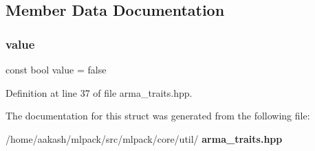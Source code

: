 \subsection{Member Data Documentation}
\mbox{\label{structIsVector_a11ddd051208250c32dc4985abcafa86d}} 
\subsubsection{value}
{\footnotesize\ttfamily const bool value = false\hspace{0.3cm}{\ttfamily [static]}}



Definition at line 37 of file arma\+\_\+traits.\+hpp.



The documentation for this struct was generated from the following file\+:\begin{DoxyCompactItemize}
\item 
/home/aakash/mlpack/src/mlpack/core/util/\textbf{ arma\+\_\+traits.\+hpp}\end{DoxyCompactItemize}
